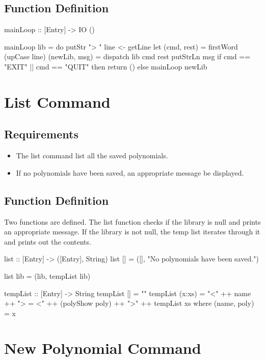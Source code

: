 \subsection{Function Definition}
\begin{code}
mainLoop :: [Entry] -> IO ()

mainLoop lib = do
  putStr "> "
  line <- getLine
  let (cmd, rest) = firstWord (upCase line)
      (newLib, msg) = dispatch lib cmd rest
  putStrLn msg
  if cmd == "EXIT" || cmd == "QUIT"
  then return ()
  else mainLoop newLib
\end{code}

\section{List Command}
\subsection{Requirements}
\begin{itemize}
\item The list command  list all the saved polynomials.
\item If no polynomials have been saved, an appropriate message  be displayed.
\end{itemize}
\subsection{Function Definition}
Two functions are defined.  The list function checks if the library is null and prints an appropriate message.  If the library is not null, the temp list iterates through it and prints out the contents.
\begin{code}
list :: [Entry] -> ([Entry], String)
list [] = ([], "No polynomials have been saved.")
  
list lib = (lib, tempList lib)

tempList :: [Entry] -> String
tempList [] = ""
tempList (x:xs) = "<" ++ name ++ "> = <" ++ (polyShow poly) ++ ">\n" ++ tempList xs
  where (name, poly) = x
\end{code}

\section{New Polynomial Command}
